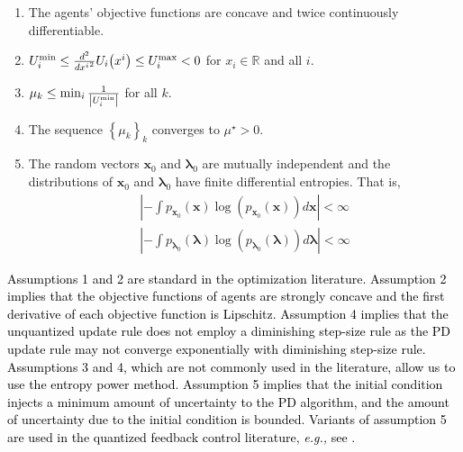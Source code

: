 \documentclass[10pt,twocolumn,twoside]{IEEEtran}
\begin{document}
\begin{enumerate}
\item The agents' objective functions are concave and twice continuously differentiable.
\item $U^{\rm min}_i\leq \frac{d^2}{d {x^i}^2}U_i{\left({x^i}\right)}\leq U^{\rm max}_i<0$ for $x_i\in {\ensuremath{{\ensuremath{\mathbb{{R}}}}}}$ and all $i$.
\item $\mu_k\leq \min_i\frac{1}{{\left|{U^{\rm min}_i}\right|}}$ for all $k$.
\item The sequence $\left\{\mu_k\right\}_k$ converges to $\mu^\star>0$.
\item The random vectors ${\ensuremath{\boldsymbol{{x}}}}_0$ and ${\ensuremath{\boldsymbol{{\lambda}}}}_0$ are mutually independent and the distributions of ${\ensuremath{\boldsymbol{{x}}}}_0$ and ${\ensuremath{\boldsymbol{{\lambda}}}}_0$ have finite differential entropies. That is,
\begin{eqnarray}
\left | - \int p_{{\ensuremath{\boldsymbol{{x}}}}_{0}}{\left({{\ensuremath{\boldsymbol{{x}}}}}\right)}{\ensuremath{\log{\left({{p_{{\ensuremath{\boldsymbol{{x}}}}_{0}}{\left({{\ensuremath{\boldsymbol{{x}}}}}\right)}}}\right)}}}d{\ensuremath{\boldsymbol{{x}}}}\right | <\infty\nonumber\\
\left | - \int p_{{\ensuremath{\boldsymbol{{\lambda}}}}_{0}}{\left({{\ensuremath{\boldsymbol{{\lambda}}}}}\right)}{\ensuremath{\log{\left({{p_{{\ensuremath{\boldsymbol{{\lambda}}}}_{0}}{\left({{\ensuremath{\boldsymbol{{\lambda}}}}}\right)}}}\right)}}}d{\ensuremath{\boldsymbol{{\lambda}}}}\right | <\infty\nonumber
\end{eqnarray}
\end{enumerate}
\textcolor{black}{Assumptions 1 and 2 are standard in the optimization literature. Assumption 2 implies that the objective functions of agents are strongly concave and the first derivative of each objective function is Lipschitz. Assumption 4 implies that the unquantized update rule does not employ a diminishing step-size rule as the PD update rule may not converge  exponentially with diminishing step-size rule. Assumptions 3 and 4, which are not commonly used in the literature, allow us to use the entropy power method. Assumption 5 implies that the initial condition injects a minimum  amount of uncertainty to the PD algorithm, and the amount of uncertainty due to the initial condition is bounded. Variants of assumption 5 are used in the quantized feedback control literature, \emph{e.g.,} see \cite{NE04}.
}
\end{document}
